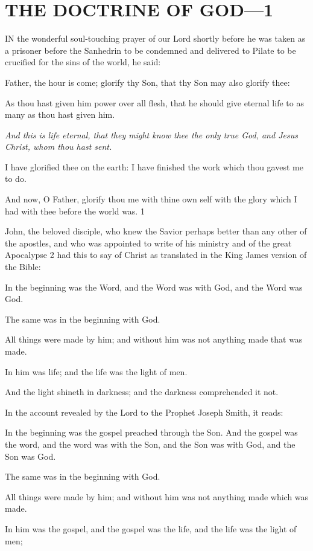 \chapter{THE DOCTRINE OF GOD—1}

IN the wonderful soul-touching prayer of our Lord shortly before he was taken as a prisoner
before the Sanhedrin to be condemned and delivered to Pilate to be crucified for the sins of
the world, he said:

Father, the hour is come; glorify thy Son, that thy Son may also glorify thee:

As thou hast given him power over all flesh, that he should give eternal life to as many as
thou hast given him.

\textit{And this is life eternal, that they might know thee the only true God, and Jesus Christ, whom
thou hast sent.}

I have glorified thee on the earth: I have finished the work which thou gavest me to do.

And now, O Father, glorify thou me with thine own self with the glory which I had with thee
before the world was. 1

John, the beloved disciple, who knew the Savior perhaps better than any other of the apostles,
and who was appointed to write of his ministry and of the great Apocalypse 2 had this to say
of Christ as translated in the King James version of the Bible:

In the beginning was the Word, and the Word was with God, and the Word was God.

The same was in the beginning with God.

All things were made by him; and without him was not anything made that was made.

In him was life; and the life was the light of men.

And the light shineth in darkness; and the darkness comprehended it not.

In the account revealed by the Lord to the Prophet Joseph Smith, it reads:

In the beginning was the gospel preached through the Son. And the gospel was the word, and
the word was with the Son, and the Son was with God, and the Son was God.

The same was in the beginning with God.

All things were made by him; and without him was not anything made which was made.

In him was the gospel, and the gospel was the life, and the life was the light of men;

